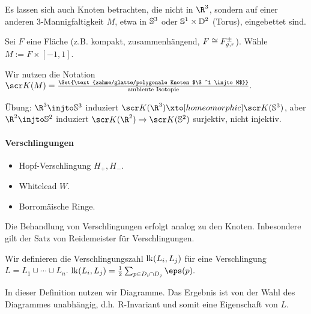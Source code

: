 Es lassen sich auch Knoten betrachten, die nicht in $\R^3$, sondern auf einer anderen $3$-Mannigfaltigkeit $M$, etwa in $\S^3$ oder $\S^1 \times \D^2$ (Torus), eingebettet sind.

\begin{ex}
    Sei $F$ eine Fläche (z.B. kompakt, zusammenhängend, $F \homeomorphic F_{g,r}^\pm$).
    Wähle $M := F \times [-1,1]$.
\end{ex}

\begin{df}
    Wir nutzen die Notation
    \begin{math}
        \scr K(M) = \frac{\Set{\text{zahme/glatte/polygonale Knoten $\S^1 \injto M$}}}{\text{ambiente Isotopie}}.
    \end{math}
\end{df}

Übung: $\R^3 \injto \S^3$ induziert $\scr K(\R^3) \homto \scr K(\S^3)$, aber $\R^2 \injto \S^2$ induziert $\scr K(\R^2) \to \scr K(\S^2)$ surjektiv, nicht injektiv.

\paragraph{Verschlingungen}

\begin{ex}
    \begin{itemize}
        \item
            Hopf-Verschlingung $H_+, H_-$.
        \item
            Whitelead $W$.
        \item
            Borromäische Ringe.
    \end{itemize}
\end{ex}

Die Behandlung von Verschlingungen erfolgt analog zu den Knoten.
Inbesondere gilt der Satz von Reidemeister für Verschlingungen.

\begin{df}
    Wir definieren die Verschlingungszahl $\lk(L_i, L_j)$ für eine Verschlingung $L = L_1 \cup \dotsb \cup L_n$.
    \begin{math}
        \lk(L_i,L_j) = \frac{1}{2} \sum_{p\in D_i \cap D_j} \eps(p). 
    \end{math}
    \begin{note}
        In dieser Definition nutzen wir Diagramme.
        Das Ergebnis ist von der Wahl des Diagrammes unabhängig, d.h. R-Invariant und somit eine Eigenschaft von $L$.
    \end{note}
\end{df}

